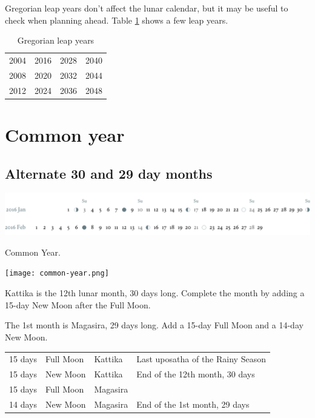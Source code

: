 \documentclass[11pt,oneside]{memoir-article}
\begin{document}
Gregorian leap years don't affect the lunar calendar, but it may be useful to
check when planning ahead. Table \ref{tbl-cycle-leap-years} shows a few leap
years.

\begin{table}[h]
\caption{\label{tbl-cycle-leap-years} Gregorian leap years}
\centering
\begin{tabular}{rrrr}
2004 & 2016 & 2028 & 2040\\
2008 & 2020 & 2032 & 2044\\
2012 & 2024 & 2036 & 2048\\
\end{tabular}
\end{table}

\clearpage

\section{Common year}
\label{sec-1-2}
\label{common-year}
\subsection{Alternate 30 and 29 day months}
\label{sec-1-2-1}

\begin{fullwidth}
\includegraphics[width=\linewidth]{two-months.pdf}
\end{fullwidth}

\begin{marginfigure}[20mm]
\caption{\label{fig-common-year} Common Year.}
\texttt{[image: common-year.png]}
\end{marginfigure}

Kattika is the 12th lunar month, 30 days long. Complete the month by adding a
15-day New Moon after the Full Moon.

The 1st month is Magasira, 29 days long. Add a 15-day Full Moon and a 14-day New
Moon.

\begin{center}
\begin{tabular}{llll}
15 days & \mF{} Full Moon & Kattika & Last uposatha of the Rainy Season\\
15 days & \mN{} New Moon & Kattika & End of the 12th month, 30 days\\
15 days & \mF{} Full Moon & Magasira & \\
14 days & \mN{} New Moon & Magasira & End of the 1st month, 29 days\\
\end{tabular}
\end{center}
\end{document}
